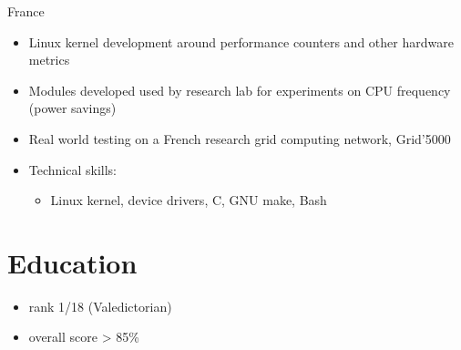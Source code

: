 \documentclass[a4paper,10pt,sans,colorlinks=true]{moderncv}
\begin{document}
{}{France}
{
  \begin{itemize}
    \item Linux kernel development around performance counters and other hardware metrics
    \item Modules developed used by research lab for experiments on CPU frequency (power savings)
    \item Real world testing on a French research grid computing network, Grid'5000
    \item Technical skills:
      \begin{itemize}
        \item Linux kernel, device drivers, C, GNU make, Bash
      \end{itemize}
  \end{itemize}
}

\addvspace{5ex}

\section{Education}
{
  \begin{itemize}
  \item rank 1/18 (Valedictorian)
  \item overall score > 85\%
  \end{itemize}
}
\end{document}

